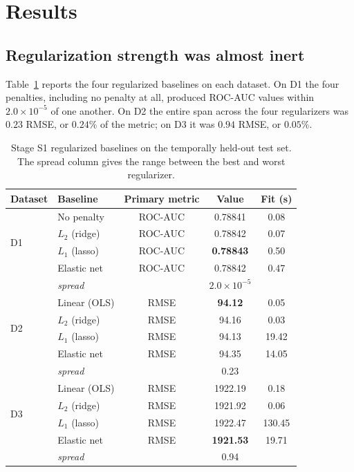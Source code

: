 \documentclass{ieeeaccess}
\begin{document}
\section{Results}
\label{sec:results}

\subsection{Regularization strength was almost inert}
Table~\ref{tab:baselines} reports the four regularized baselines on each dataset. On D1 the four penalties, including no penalty at all, produced ROC-AUC values within $2.0\times10^{-5}$ of one another. On D2 the entire span across the four regularizers was $0.23$ RMSE, or $0.24\%$ of the metric; on D3 it was $0.94$ RMSE, or $0.05\%$.

\begin{table}[t]
\caption{Stage S1 regularized baselines on the temporally held-out test set. The spread column gives the range between the best and worst regularizer.}
\label{tab:baselines}
\centering
\footnotesize
\setlength{\tabcolsep}{3pt}
\begin{tabular}{llccc}
\toprule
Dataset & Baseline & Primary metric & Value & Fit (s) \\
\midrule
\multirow{4}{*}{D1} & No penalty & ROC-AUC & 0.78841 & 0.08 \\
 & $L_2$ (ridge) & ROC-AUC & 0.78842 & 0.07 \\
 & $L_1$ (lasso) & ROC-AUC & \textbf{0.78843} & 0.50 \\
 & Elastic net & ROC-AUC & 0.78842 & 0.47 \\
 & \multicolumn{2}{l}{\emph{spread}} & $2.0\times10^{-5}$ & \\
\midrule
\multirow{4}{*}{D2} & Linear (OLS) & RMSE & \textbf{94.12} & 0.05 \\
 & $L_2$ (ridge) & RMSE & 94.16 & 0.03 \\
 & $L_1$ (lasso) & RMSE & 94.13 & 19.42 \\
 & Elastic net & RMSE & 94.35 & 14.05 \\
 & \multicolumn{2}{l}{\emph{spread}} & 0.23 & \\
\midrule
\multirow{4}{*}{D3} & Linear (OLS) & RMSE & 1922.19 & 0.18 \\
 & $L_2$ (ridge) & RMSE & 1921.92 & 0.06 \\
 & $L_1$ (lasso) & RMSE & 1922.47 & 130.45 \\
 & Elastic net & RMSE & \textbf{1921.53} & 19.71 \\
 & \multicolumn{2}{l}{\emph{spread}} & 0.94 & \\
\bottomrule
\end{tabular}
\end{table}
\end{document}
